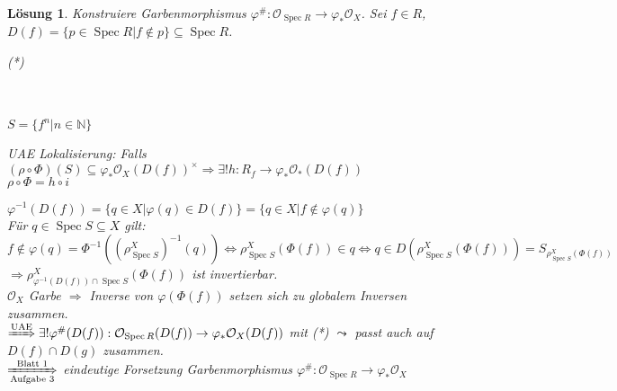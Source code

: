 \documentclass[a4paper, 12pt, numbers=noendperiod, chapterprefix=true]{scrbook}
\theoremstyle{break}
\newtheorem{Loes}{L\"osung}
\theoremstyle{nonumberbreak}
\theoremstyle{nonumberplain}
\newcommand{\quot}[1]{\textrm{\glqq}{#1}\textrm{\grqq}}
\newcommand{\schraffiert}{\ensuremath{\nicefrac{\nicefrac{}{}}{\nicefrac{}{}}}}
\DeclareMathOperator{\Spec}{Spec}
\newcommand{\N}{\mathbb{N}}
\newcommand{\calO}{\mathcal{O}}
\begin{document}
\begin{Loes}
Konstruiere Garbenmorphismus $\varphi^\#: \calO_{\Spec R} \to \varphi_*\calO_X$. Sei $f\in R$, $D(f) = \{p \in \Spec R | f\notin p\} \subseteq \Spec R$.
\begin{center}(*)
\\ \ \\$S=\{f^n|n\in \N\}$\end{center}
\emph{UAE Lokalisierung:} Falls $(\rho \circ \Phi)(S) \subseteq \varphi_*\calO_X(D(f))^\times \Rightarrow \exists! h : R_f \to \varphi_*\calO_*(D(f))$\\
$\rho \circ \Phi = h \circ i$

$\varphi^{-1}(D(f)) = \{q \in X | \varphi(q) \in D(f)\} = \{q \in X | f \notin \varphi(q)\}$\\
F\"ur $q \in \Spec S \subseteq X$ gilt:
	\[f \notin \varphi(q) = \Phi^{-1}((\rho_{\Spec S}^X)^{-1}(q)) \Leftrightarrow \rho_{\Spec S}^X (\Phi(f)) \in q \Leftrightarrow q \in D(\rho_{\Spec S}^X(\Phi(f))) = S_{\rho_{\Spec S}^X (\Phi (f))} \]
$\Rightarrow \rho_{\varphi^{-1}(D(f)) \cap \Spec S}^X (\Phi(f))$ ist invertierbar.\\
$\calO_X$ Garbe $\Rightarrow $ Inverse von $\varphi(\Phi(f))$ setzen sich zu \quot{globalem} Inversen zusammen.\\
$\xRightarrow{\text{UAE}} \exists! \varphi^\#(D(f)) : \calO_{\Spec R}(D(f)) \to \varphi_*\calO_X(D(f))$ mit (*) $\leadsto$ passt auch auf $D(f) \cap D(g)$ zusammen.\\
$\xRightarrow[\text{Aufgabe 3}]{\text{Blatt 1}}$ eindeutige Forsetzung Garbenmorphismus $\varphi^\#: \calO_{\Spec R} \to \varphi_*\calO_X$


\end{Loes}
\end{document}
